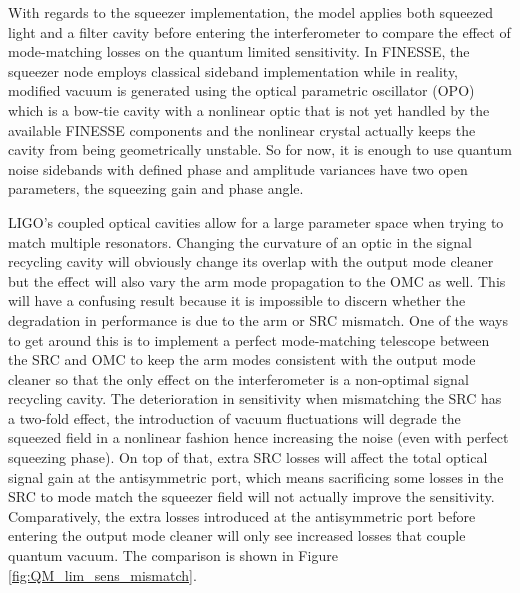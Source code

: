	With regards to the squeezer implementation, the model applies both squeezed light and a filter cavity before entering the interferometer to compare the effect of mode-matching losses on the quantum limited sensitivity.  In FINESSE, the squeezer node employs classical sideband implementation while in reality, modified vacuum is generated using the optical parametric oscillator (OPO) which is a bow-tie cavity with a nonlinear optic that is not yet handled by the available FINESSE components and the nonlinear crystal actually keeps the cavity from being geometrically unstable. So for now, it is enough to use quantum noise sidebands with defined phase and amplitude variances have two open parameters, the squeezing gain and phase angle. 
	
	LIGO's coupled optical cavities allow for a large parameter space when trying to match multiple resonators.   Changing the curvature of an optic in the signal recycling cavity will obviously change its overlap with the output mode cleaner but the effect will also vary the arm mode propagation to the OMC as well.  This will have a confusing result because it is impossible to discern whether the degradation in performance is due to the arm or SRC mismatch.  One of the ways to get around this is to implement a perfect mode-matching telescope between the SRC and OMC to keep the arm modes consistent with the output mode cleaner so that the only effect on the interferometer is a non-optimal signal recycling cavity.  The deterioration in sensitivity when mismatching the SRC has a two-fold effect, the introduction of vacuum fluctuations will degrade the squeezed field in a nonlinear fashion hence increasing the noise (even with perfect squeezing phase).  On top of that, extra SRC losses will affect the total optical signal gain at the antisymmetric port, which means sacrificing some losses in the SRC to mode match the squeezer field will not actually improve the sensitivity.  Comparatively, the extra losses introduced at the antisymmetric port before entering the output mode cleaner will only see increased losses that couple quantum vacuum.  The comparison is shown in Figure \ref{fig:QM_lim_sens_mismatch}.
